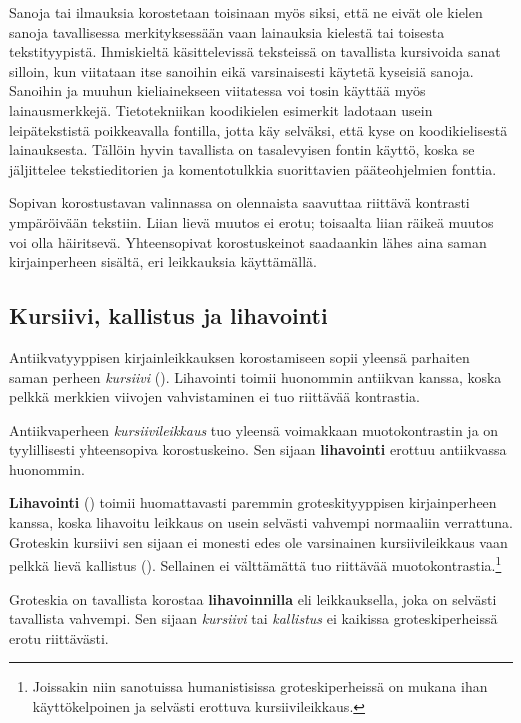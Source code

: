 Sanoja tai ilmauksia korostetaan toisinaan myös siksi, että ne eivät ole
kielen sanoja tavallisessa merkityksessään vaan lainauksia kielestä tai
toisesta tekstityypistä. Ihmiskieltä käsittelevissä teksteissä on
tavallista kursivoida sanat silloin, kun viitataan itse sanoihin eikä
varsinaisesti käytetä kyseisiä sanoja. Sanoihin ja muuhun kieliainekseen
viitatessa voi tosin käyttää myös lainausmerkkejä. Tietotekniikan
koodikielen esimerkit ladotaan usein leipätekstistä poikkeavalla
fontilla, jotta käy selväksi, että kyse on koodikielisestä lainauksesta.
Tällöin hyvin tavallista on tasalevyisen fontin käyttö, koska se
jäljittelee tekstieditorien ja komentotulkkia suorittavien
pääteohjelmien fonttia.

Sopivan korostustavan valinnassa on olennaista saavuttaa riittävä
kontrasti ympäröivään tekstiin. Liian lievä muutos ei erotu; toisaalta
liian räikeä muutos voi olla häiritsevä. Yhteensopivat korostuskeinot
saadaankin lähes aina saman kirjainperheen sisältä, eri leikkauksia
käyttämällä.

\subsection{Kursiivi, kallistus ja lihavointi}
\label{luku/peruskorostukset}

Antiikvatyyppisen kirjainleikkauksen korostamiseen sopii yleensä
parhaiten saman perheen \textit{kursiivi} ().
Lihavointi toimii huonommin antiikvan kanssa, koska pelkkä merkkien
viivojen vahvistaminen ei tuo riittävää kontrastia.

\begin{tulossis}
  \rmfamily Antiikvaperheen \textit{kursiivileikkaus} tuo yleensä
  voimakkaan muotokontrastin ja on tyylillisesti yhteensopiva
  korostuskeino. Sen sijaan \textbf{lihavointi} erottuu antiikvassa
  huonommin.
\end{tulossis}

\textbf{Lihavointi} () toimii huomattavasti paremmin
groteskityyppisen kirjainperheen kanssa, koska lihavoitu leikkaus on
usein selvästi vahvempi normaaliin verrattuna. Groteskin kursiivi sen
sijaan ei monesti edes ole varsinainen kursiivileikkaus vaan pelkkä
lievä kallistus (). Sellainen ei välttämättä tuo
riittävää muotokontrastia.\footnote{Joissakin niin sanotuissa
  humanistisissa groteskiperheissä on mukana ihan käyttökelpoinen ja
  selvästi erottuva kursiivileikkaus.}

\begin{tulossis}
  \sffamily Groteskia on tavallista korostaa \textbf{lihavoinnilla} eli
  leikkauksella, joka on selvästi tavallista vahvempi. Sen sijaan
  \textit{kursiivi} tai \textsl{kallistus} ei kaikissa groteskiperheissä
  erotu riittävästi.
\end{tulossis}

